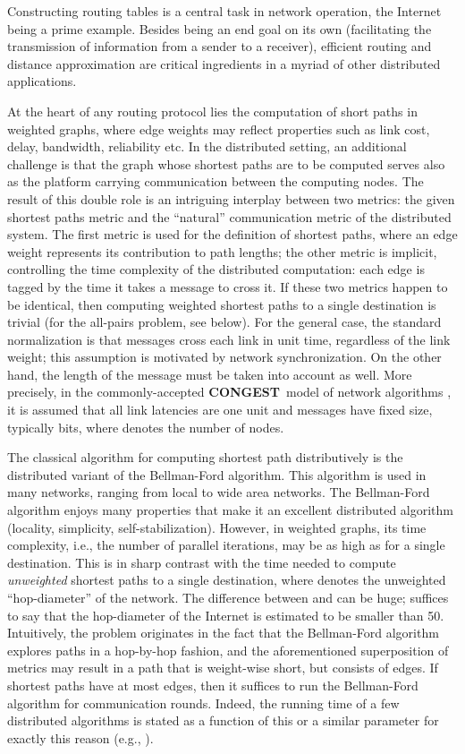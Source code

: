 \documentclass[letterpaper,11pt]{article}
\newcommand{\CONGEST}{\textbf{CONGEST}}
\begin{document}
Constructing routing tables is a central task in network operation, the
Internet being a prime example. Besides being an end goal on its own
(facilitating the transmission of information from a sender to a
receiver), efficient routing and distance approximation are critical
ingredients in a myriad of other distributed applications.

At the heart of any routing protocol lies the computation of short paths in
weighted graphs, where edge weights may reflect properties such as link cost,
delay, bandwidth, reliability etc. In the distributed setting, an additional
challenge is that the graph whose shortest paths are to be computed serves also
as the platform carrying communication between the computing nodes. The result
of this double role is an intriguing interplay between two metrics: the given
shortest paths metric and the ``natural'' communication metric of the
distributed system. The first metric is used for the definition of shortest
paths, where an edge weight represents its contribution to path lengths; the
other metric is implicit, controlling the time complexity of the distributed
computation: each edge is tagged by the time it takes a message to cross it. If
these two metrics happen to be identical, then computing weighted shortest paths
to a single destination is trivial (for the all-pairs problem, see below).
For the general case, the standard normalization is that messages cross each
link in unit time, regardless of the link weight; this assumption is motivated by
network synchronization. On the other hand, the length of the message must be
taken into account as well. More precisely, in the commonly-accepted  \CONGEST\
model of network algorithms \cite{Peleg:book}, it is assumed that all link
latencies are one unit and messages have fixed size, typically 
bits, where  denotes the number of nodes.

The classical algorithm for computing shortest path distributively is the
distributed variant of the Bellman-Ford algorithm. This algorithm is used in
many networks, ranging from local to wide area networks. The Bellman-Ford
algorithm enjoys many properties that make it an excellent distributed algorithm
(locality, simplicity, self-stabilization). However, in weighted graphs, its
time complexity, i.e., the number of parallel iterations, may be as high as
 for a single destination. This is in sharp contrast with the
 time needed to compute \emph{unweighted} shortest paths to a single
destination, where  denotes the unweighted ``hop-diameter'' of the network.
The difference between  and  can be huge; suffices to say that the
hop-diameter of the Internet is estimated to be smaller than 50. Intuitively,
the problem originates in the fact that the Bellman-Ford algorithm explores
paths in a hop-by-hop fashion, and the aforementioned superposition of metrics may
result in a  path that is weight-wise short, but consists of  edges.
If shortest paths have at most  edges, then it suffices to run the
Bellman-Ford algorithm for  communication rounds. Indeed, the running time
of a few distributed algorithms is stated as a function of this or a similar
parameter for exactly this reason (e.g., \cite{DDP,KKMPT,KP-08}).
\end{document}
